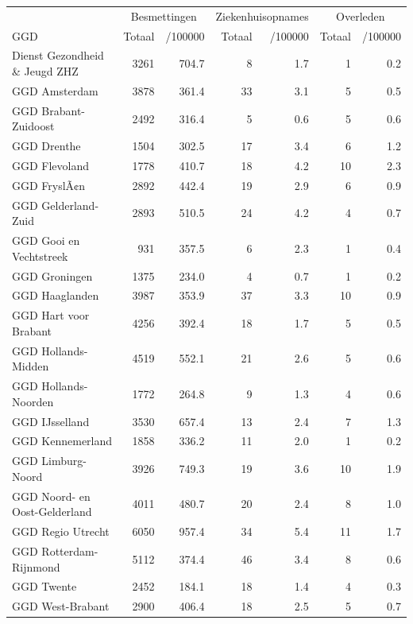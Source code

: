 \documentclass[
  english,
  man,floatsintext]{apa6}
\begin{document}
\begin{table}
\centering\begingroup\fontsize{10}{12}\selectfont

\begin{threeparttable}
\begin{tabular}{lrrrrrr}
\toprule
\multicolumn{1}{c}{ } & \multicolumn{2}{c}{Besmettingen} & \multicolumn{2}{c}{Ziekenhuisopnames} & \multicolumn{2}{c}{Overleden} \\
\cmidrule(l{3pt}r{3pt}){2-3} \cmidrule(l{3pt}r{3pt}){4-5} \cmidrule(l{3pt}r{3pt}){6-7}
GGD & Totaal & /100000 & Totaal & /100000 & Totaal & /100000\\
\midrule
Dienst Gezondheid \& Jeugd ZHZ & 3261 & 704.7 & 8 & 1.7 & 1 & 0.2\\
GGD Amsterdam & 3878 & 361.4 & 33 & 3.1 & 5 & 0.5\\
GGD Brabant-Zuidoost & 2492 & 316.4 & 5 & 0.6 & 5 & 0.6\\
GGD Drenthe & 1504 & 302.5 & 17 & 3.4 & 6 & 1.2\\
GGD Flevoland & 1778 & 410.7 & 18 & 4.2 & 10 & 2.3\\
GGD FryslÃ¢n & 2892 & 442.4 & 19 & 2.9 & 6 & 0.9\\
GGD Gelderland-Zuid & 2893 & 510.5 & 24 & 4.2 & 4 & 0.7\\
GGD Gooi en Vechtstreek & 931 & 357.5 & 6 & 2.3 & 1 & 0.4\\
GGD Groningen & 1375 & 234.0 & 4 & 0.7 & 1 & 0.2\\
GGD Haaglanden & 3987 & 353.9 & 37 & 3.3 & 10 & 0.9\\
GGD Hart voor Brabant & 4256 & 392.4 & 18 & 1.7 & 5 & 0.5\\
GGD Hollands-Midden & 4519 & 552.1 & 21 & 2.6 & 5 & 0.6\\
GGD Hollands-Noorden & 1772 & 264.8 & 9 & 1.3 & 4 & 0.6\\
GGD IJsselland & 3530 & 657.4 & 13 & 2.4 & 7 & 1.3\\
GGD Kennemerland & 1858 & 336.2 & 11 & 2.0 & 1 & 0.2\\
GGD Limburg-Noord & 3926 & 749.3 & 19 & 3.6 & 10 & 1.9\\
GGD Noord- en Oost-Gelderland & 4011 & 480.7 & 20 & 2.4 & 8 & 1.0\\
GGD Regio Utrecht & 6050 & 957.4 & 34 & 5.4 & 11 & 1.7\\
GGD Rotterdam-Rijnmond & 5112 & 374.4 & 46 & 3.4 & 8 & 0.6\\
GGD Twente & 2452 & 184.1 & 18 & 1.4 & 4 & 0.3\\
GGD West-Brabant & 2900 & 406.4 & 18 & 2.5 & 5 & 0.7\\

\end{tabular}
\end{threeparttable}
\end{table}
\end{document}
